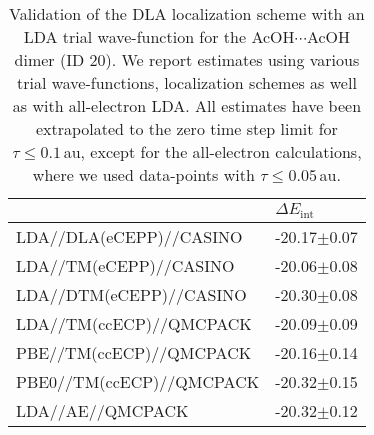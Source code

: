 \begin{table}[h!]
\caption{\label{tab:acetic_acid_validation}Validation of the DLA localization scheme with an LDA trial wave-function for the AcOH$\cdots$AcOH dimer (ID 20). We report estimates using various trial wave-functions, localization schemes as well as with all-electron LDA. All estimates have been extrapolated to the zero time step limit for $\tau{\leq}0.1\,$au, except for the all-electron calculations, where we used data-points with $\tau{\leq}0.05\,$au.}
\begin{adjustbox}{center}
\begin{tabular}{ll}
\toprule
 & $\Delta E_\text{int}$ \\ 
\midrule
LDA//DLA(eCEPP)//CASINO & -20.17$\pm$0.07 \\
LDA//TM(eCEPP)//CASINO & -20.06$\pm$0.08 \\
LDA//DTM(eCEPP)//CASINO & -20.30$\pm$0.08 \\
LDA//TM(ccECP)//QMCPACK & -20.09$\pm$0.09 \\
PBE//TM(ccECP)//QMCPACK & -20.16$\pm$0.14 \\
PBE0//TM(ccECP)//QMCPACK & -20.32$\pm$0.15 \\
LDA//AE//QMCPACK & -20.32$\pm$0.12 \\
\bottomrule
\end{tabular}
\end{adjustbox}
\end{table}